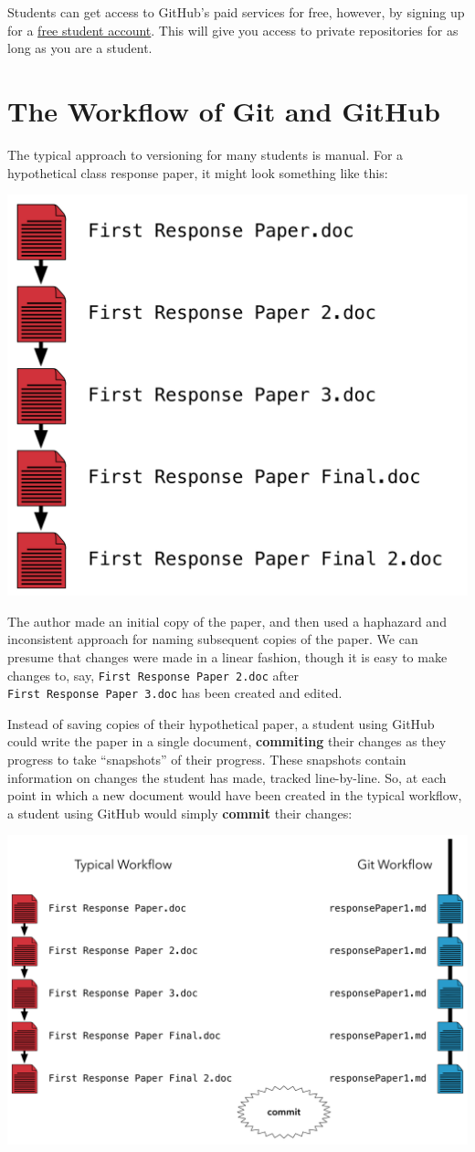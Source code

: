 \documentclass[]{book}
\begin{document}
Students can get access to GitHub's paid services for free, however, by
signing up for a \href{https://education.github.com}{free student
account}. This will give you access to private repositories for as long
as you are a student.

\section{The Workflow of Git and
GitHub}\label{the-workflow-of-git-and-github}

The typical approach to versioning for many students is manual. For a
hypothetical class response paper, it might look something like this:

\includegraphics[width=0.5\linewidth]{images/gitFlow01}

The author made an initial copy of the paper, and then used a haphazard
and inconsistent approach for naming subsequent copies of the paper. We
can presume that changes were made in a linear fashion, though it is
easy to make changes to, say, \texttt{First\ Response\ Paper\ 2.doc}
after \texttt{First\ Response\ Paper\ 3.doc} has been created and
edited.

Instead of saving copies of their hypothetical paper, a student using
GitHub could write the paper in a single document, \textbf{commiting}
their changes as they progress to take ``snapshots'' of their progress.
These snapshots contain information on changes the student has made,
tracked line-by-line. So, at each point in which a new document would
have been created in the typical workflow, a student using GitHub would
simply \textbf{commit} their changes:

\includegraphics[width=1\linewidth]{images/gitFlow02}
\end{document}
